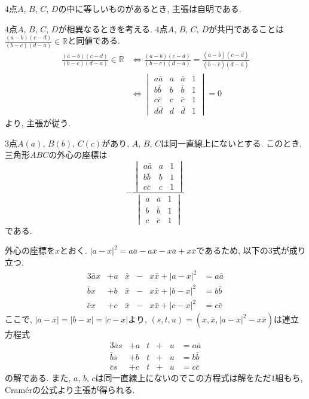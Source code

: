 \begin{prf*}
$4$点$A$, $B$, $C$, $D$の中に等しいものがあるとき, 主張は自明である.

$4$点$A$, $B$, $C$, $D$が相異なるときを考える.
$4$点$A$, $B$, $C$, $D$が共円であることは$\frac{(a-b)(c-d)}{(b-c)(d-a)}\in\mathbb{R}$と同値である.
\[
\begin{aligned}
\frac{(a-b)(c-d)}{(b-c)(d-a)}\in\mathbb{R}&\iff\frac{(a-b)(c-d)}{(b-c)(d-a)}=\frac{(\bar{a}-\bar{b})(\bar{c}-\bar{d})}{(\bar{b}-\bar{c})(\bar{d}-\bar{a})}\\
&\iff\begin{vmatrix}a\bar{a}&a&\bar{a}&1\\b\bar{b}&b&\bar{b}&1\\c\bar{c}&c&\bar{c}&1\\d\bar{d}&d&\bar{d}&1\end{vmatrix}=0
\end{aligned}
\]
より, 主張が従う.
\end{prf*}
%
%
\begin{bthm}\label{thm:circumcenter}
$3$点$A(a)$, $B(b)$, $C(c)$があり, $A$, $B$, $C$は同一直線上にないとする.
このとき, 三角形$ABC$の外心の座標は
\[
-\frac{\begin{vmatrix}a\bar{a}&a&1\\b\bar{b}&b&1\\c\bar{c}&c&1\end{vmatrix}}{\begin{vmatrix}a&\bar{a}&1\\b&\bar{b}&1\\c&\bar{c}&1\end{vmatrix}}
\]
である.
\end{bthm}
\begin{prf*}
外心の座標を$x$とおく.
$\lvert a-x\rvert^2=a\bar{a}-a\bar{x}-x\bar{a}+x\bar{x}$であるため, 以下の$3$式が成り立つ.
\begin{alignat*}{3}
\bar{a}x&+a&\bar{x}&-{}&x\bar{x}+\lvert a-x\rvert^2&=a\bar{a}\\
\bar{b}x&+b&\bar{x}&-{}&x\bar{x}+\lvert b-x\rvert^2&=b\bar{b}\\
\bar{c}x&+c&\bar{x}&-{}&x\bar{x}+\lvert c-x\rvert^2&=c\bar{c}
\end{alignat*}
ここで, $\lvert a-x\rvert=\lvert b-x\rvert=\lvert c-x\rvert$より, $(s,t,u)=(x,\bar{x},\lvert a-x\rvert^2-x\bar{x})$は連立方程式
\begin{alignat*}{3}
\bar{a}s&+a&t&+{}&u&=a\bar{a}\\
\bar{b}s&+b&t&+{}&u&=b\bar{b}\\
\bar{c}s&+c&t&+{}&u&=c\bar{c}
\end{alignat*}
の解である.
また, $a$, $b$, $c$は同一直線上にないのでこの方程式は解をただ$1$組もち, Cramérの公式より主張が得られる.
\end{prf*}
